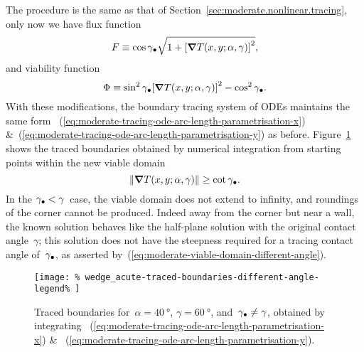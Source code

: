 The procedure is the same
as that of Section~\ref{sec:moderate.nonlinear.tracing},
only now we have flux function
\begin{equation}
  F \ideq
    \cos\tr{\gamma}
    \sqrt{1 + \squarebr[\bulkysize]{\del T (x, y; \alpha, \gamma)}^2},
  \label{eq:moderate-flux-function-different-angle}
\end{equation}
and viability function
\begin{equation}
  \Phi \ideq
    \sin^2\tr{\gamma} \squarebr[\bulkysize]{\del T (x, y; \alpha, \gamma)}^2
    - \cos^2\tr{\gamma}.
    \label{eq:moderate-viability-function-different-angle}
\end{equation}
With these modifications,
the boundary tracing system of ODEs maintains the same form~%
  (\ref{eq:moderate-tracing-ode-arc-length-parametrisation-x})
\&~(\ref{eq:moderate-tracing-ode-arc-length-parametrisation-y})
as before.
Figure~\ref{fig:wedge_acute-traced-boundaries-different-angle}
shows the traced boundaries obtained by numerical integration
from starting points within the new viable domain
\begin{equation}
  \norm[\bulkysize]{\del T (x, y; \alpha, \gamma)} \ge \cot\tr{\gamma}.
  \label{eq:moderate-viable-domain-different-angle}
\end{equation}
In the $\gamma_\bullet < \gamma$~case,
the viable domain does not extend to infinity,
and roundings of the corner cannot be produced.
Indeed away from the corner but near a wall,
the known solution behaves like the half-plane solution
with the original contact angle~$\gamma$;
this solution does not have the steepness required
for a tracing contact angle of~$\gamma_\bullet$,
as asserted by~(\ref{eq:moderate-viable-domain-different-angle}).

\begin{figure}
  \newcommand*{\subfigurewidth}{0.45\textwidth}
  \centering
  \texttt{[image: \%
    wedge\_acute-traced-boundaries-different-angle-legend\%
  ]}
  \hspace*{\fill}
  \begin{subfigure}[t]{\subfigurewidth}
  \end{subfigure}
    \hfill
  \begin{subfigure}[t]{\subfigurewidth}
  \end{subfigure}
  \hspace*{\fill}
  \caption{
    Traced boundaries for~$\alpha = \SI{40}{\degree}$,
    $\gamma = \SI{60}{\degree}$, and~$\gamma_\bullet \ne \gamma$,
    obtained by integrating~%
      (\ref{eq:moderate-tracing-ode-arc-length-parametrisation-x})
    \&~%
      (\ref{eq:moderate-tracing-ode-arc-length-parametrisation-y}).
  }
  \label{fig:wedge_acute-traced-boundaries-different-angle}
\end{figure}

